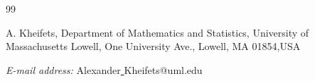 \documentclass[reqno,11pt,centertags]{article}
\theoremstyle{definition}
\begin{document}
\begin{thebibliography}{99}






%







\end{thebibliography}

\bigskip

\bigskip



A. Kheifets, Department of Mathematics and Statistics, University of Massachusetts Lowell, One University Ave.,
Lowell, MA 01854,USA

\emph{E-mail address:} {Alexander\underline{ }Kheifets@uml.edu}




 
\end{document}
